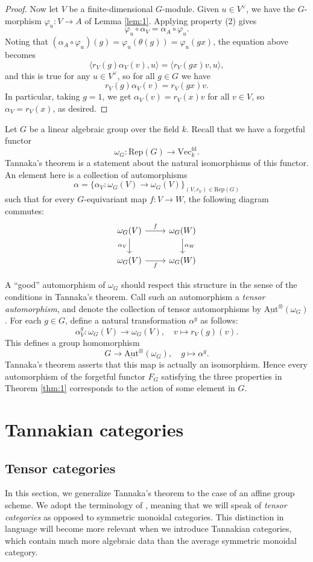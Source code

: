 \documentclass[10pt]{amsart}
\numberwithin{equation}{section}
\newcommand{\vp}{\varphi}
\newcommand{\Aut}{\mathrm{Aut}}
\newcommand{\fd}{\mathrm{fd}}
\renewcommand{\Vec}{\mathrm{Vec}}
\newcommand{\Rep}{\mathrm{Rep}}
\theoremstyle{plain}
\theoremstyle{definition}
\theoremstyle{remark}
\begin{document}
\begin{proof}
Now let $V$ be a finite-dimensional $G$-module. Given $u \in V^\vee$, we have the $G$-morphism $\vp_u: V \to A$ of Lemma \ref{lem:1}. Applying property (2) gives 
\[\vp_u \circ \alpha_V = \alpha_A \circ \vp_u.\]
Noting that $(\alpha_A \circ \vp_u)(g) = \vp_u(\theta(g)) = \vp_u(gx)$, the equation above becomes
\[\langle r_V(g) \alpha_V(v), u \rangle = \langle r_V(gx)v, u\rangle,\]
and this is true for any $u \in V^\vee$, so for all $g \in G$ we have
\[r_V(g) \alpha_V(v) = r_V(gx)v.\]
In particular, taking $g = 1$, we get $\alpha_V(v) = r_V(x)v$ for all $v \in V$, so $\alpha_V = r_V(x)$, as desired. 
\end{proof}

Let $G$ be a linear algebraic group over the field $k$. Recall that we have a forgetful functor
\[\omega_G: \Rep(G) \to \Vec_k^{\fd}.\] 
Tannaka's theorem is a statement about the natural isomorphisms of this functor. An element here is a collection of automorphisms 
\[\alpha = \{\alpha_V: \omega_G(V) \to \omega_G(V)\}_{(V, r_V) \in \Rep(G)}\]
such that for every $G$-equivariant map $f: V \to W$, the following diagram commutes:
\[\begin{tikzcd}
    {\omega_G(V)} & {\omega_G(W)} \\
    {\omega_G(V)} & {\omega_G(W)}
    \arrow["f", from=1-1, to=1-2]
    \arrow["{\alpha_V}"', from=1-1, to=2-1]
    \arrow["{\alpha_W}", from=1-2, to=2-2]
    \arrow["f"', from=2-1, to=2-2]
\end{tikzcd}\]

A ``good'' automorphism of $\omega_G$ should respect this structure in the sense of the conditions in Tannaka's theorem. Call such an automorphism a \emph{tensor automorphism}, and denote the collection of tensor automorphisms by $\underline{\Aut}^\otimes (\omega_G)$. For each $g \in G$, define a natural transformation $\alpha^g$ as follows:
\[\alpha_V^g: \omega_G(V) \to \omega_G(V), \quad v \mapsto r_V(g)(v). \]
This defines a group homomorphism
\[G \to \underline{\Aut}^\otimes(\omega_G), \quad g \mapsto \alpha^g.\]
Tannaka's theorem asserts that this map is actually an isomorphism. Hence every automorphism of the forgetful functor $F_G$ satisfying the three properties in Theorem \ref{thm:1} corresponds to the action of some element in $G$.
\section{Tannakian categories}

\subsection{Tensor categories}\label{sub:2.1}
In this section, we generalize Tannaka's theorem to the case of an affine group scheme. We adopt the terminology of \cite{deligne1982tannakian}, meaning that we will speak of \emph{tensor categories} as opposed to symmetric monoidal categories. This distinction in language will become more relevant when we introduce Tannakian categories, which contain much more algebraic data than the average symmetric monoidal category.
\end{document}
